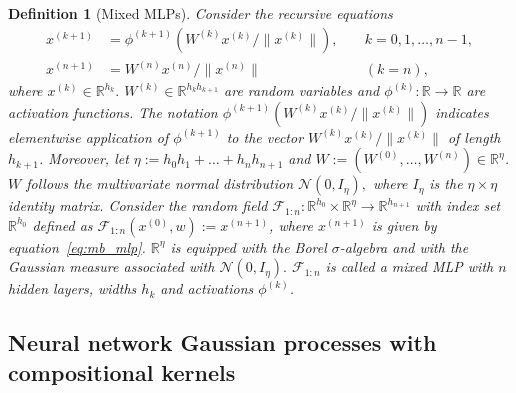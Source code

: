 \documentclass[final, 12pt]{colt2021} %
\newtheorem{dfn}{Definition}
\begin{document}
\begin{dfn}[Mixed MLPs]
\label{dfn:mixed_mlps}
Consider the recursive equations
\begin{equation}
\label{eq:mb_mlp}
\begin{alignedat}{2}
x^{(k+1)} &=
\phi^{(k+1)} (W^{(k)} x^{(k)} / \|x^{(k)}\|),
&& \;
k=0,1,\ldots,n-1,\\
x^{(n+1)}
&=
W^{(n)} x^{(n)} / \|x^{(n)}\|
&& \;
(k = n),
\end{alignedat}
\end{equation}
where
$x^{(k)}\in\mathbb{R}^{h_{k}}.$
$W^{(k)}\in\mathbb{R}^{h_{k} h_{k+1}}$ %
are random variables
and $\phi^{(k)}:\mathbb{R}\rightarrow\mathbb{R}$
are activation functions.
The notation $\phi^{(k+1)} (W^{(k)} x^{(k)} / \|x^{(k)}\|)$
indicates elementwise application of $\phi^{(k+1)}$
to the vector $W^{(k)} x^{(k)} / \|x^{(k)}\|$
of length $h_{k+1}$.
Moreover, let $\eta:=h_{0}h_{1}+\ldots +h_{n}h_{n+1}$
and $W:=(W^{(0)},\ldots, W^{(n)})\in\mathbb{R}^{\eta}$.
$W$ follows
the multivariate normal distribution
$
\mathcal{N}(0, I_{\eta}),
$
where $I_{\eta}$ is the $\eta\times\eta$ identity matrix.
Consider the
random field
$\mathcal{F}_{1:n}:\mathbb{R}^{h_0}\times\mathbb{R}^{\eta}
\rightarrow\mathbb{R}^{h_{n+1}}$
with index set $\mathbb{R}^{h_0}$
defined as $\mathcal{F}_{1:n}(x^{(0)},w):=x^{(n+1)}$,
where $x^{(n+1)}$ is given by equation~\eqref{eq:mb_mlp}.
$\mathbb{R}^{\eta}$ is equipped with the Borel $\sigma$-algebra
and with the Gaussian measure associated with
$
\mathcal{N}(0, I_{\eta}).
$
$\mathcal{F}_{1:n}$ is called a mixed MLP
with $n$ hidden layers,
widths $h_k$ and
activations $\phi^{(k)}$.
\end{dfn}

\subsection{Neural network Gaussian processes with compositional kernels}
\label{sec:mixed_nngps}
\end{document}
